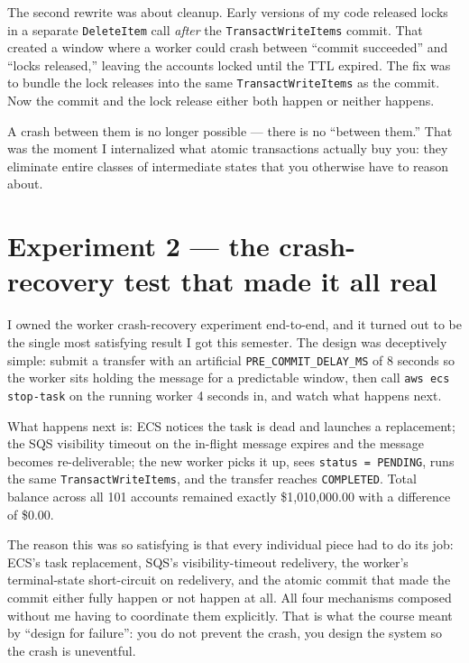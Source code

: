 \documentclass[11pt,a4paper]{article}
\begin{document}
The second rewrite was about cleanup. Early versions of my code released locks in a separate \texttt{DeleteItem} call \textit{after} the \texttt{TransactWriteItems} commit. That created a window where a worker could crash between ``commit succeeded'' and ``locks released,'' leaving the accounts locked until the TTL expired. The fix was to bundle the lock releases into the same \texttt{TransactWriteItems} as the commit. Now the commit and the lock release either both happen or neither happens.

\begin{insightbox}
A crash between them is no longer possible --- there is no ``between them.'' That was the moment I internalized what atomic transactions actually buy you: they eliminate entire classes of intermediate states that you otherwise have to reason about.
\end{insightbox}

\section{Experiment 2 --- the crash-recovery test that made it all real}

I owned the worker crash-recovery experiment end-to-end, and it turned out to be the single most satisfying result I got this semester. The design was deceptively simple: submit a transfer with an artificial \texttt{PRE\_COMMIT\_DELAY\_MS} of 8 seconds so the worker sits holding the message for a predictable window, then call \texttt{aws ecs stop-task} on the running worker 4 seconds in, and watch what happens next.

What happens next is: ECS notices the task is dead and launches a replacement; the SQS visibility timeout on the in-flight message expires and the message becomes re-deliverable; the new worker picks it up, sees \texttt{status = PENDING}, runs the same \texttt{TransactWriteItems}, and the transfer reaches \texttt{COMPLETED}. Total balance across all 101 accounts remained exactly \$1{,}010{,}000.00 with a difference of \$0.00.

\begin{insightbox}
The reason this was so satisfying is that every individual piece had to do its job: ECS's task replacement, SQS's visibility-timeout redelivery, the worker's terminal-state short-circuit on redelivery, and the atomic commit that made the commit either fully happen or not happen at all. All four mechanisms composed without me having to coordinate them explicitly. That is what the course meant by ``design for failure'': you do not prevent the crash, you design the system so the crash is uneventful.
\end{insightbox}
\end{document}
